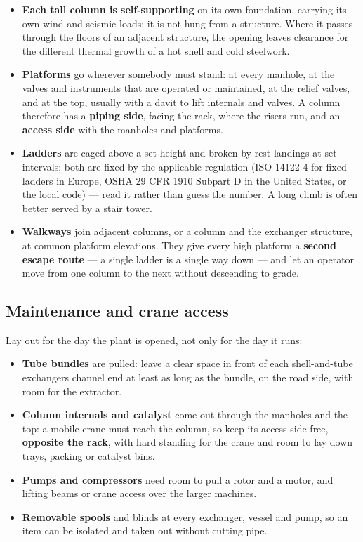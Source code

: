 \documentclass[11pt,a4paper]{article}
\providecommand{\tightlist}{\setlength{\itemsep}{0pt}\setlength{\parskip}{0pt}}
\begin{document}
\begin{itemize}
\tightlist
\item
  \textbf{Each tall column is self-supporting} on its own foundation,
  carrying its own wind and seismic loads; it is not hung from a
  structure. Where it passes through the floors of an adjacent structure,
  the opening leaves clearance for the different thermal growth of a hot
  shell and cold steelwork.
\item
  \textbf{Platforms} go wherever somebody must stand: at every manhole,
  at the valves and instruments that are operated or maintained, at the
  relief valves, and at the top, usually with a davit to lift internals
  and valves. A column therefore has a \textbf{piping side}, facing the
  rack, where the risers run, and an \textbf{access side} with the
  manholes and platforms.
\item
  \textbf{Ladders} are caged above a set height and broken by rest
  landings at set intervals; both are fixed by the applicable regulation
  (ISO 14122-4 for fixed ladders in Europe, OSHA 29 CFR 1910 Subpart D in
  the United States, or the local code) --- read it rather than guess the
  number. A long climb is often better served by a stair tower.
\item
  \textbf{Walkways} join adjacent columns, or a column and the exchanger
  structure, at common platform elevations. They give every high platform
  a \textbf{second escape route} --- a single ladder is a single way down
  --- and let an operator move from one column to the next without
  descending to grade.
\end{itemize}

\hypertarget{maintenance-and-crane-access}{%
\subsection{Maintenance and crane
access}\label{maintenance-and-crane-access}}

Lay out for the day the plant is opened, not only for the day it runs:

\begin{itemize}
\tightlist
\item
  \textbf{Tube bundles} are pulled: leave a clear space in front of each
  shell-and-tube exchanger\textquotesingle s channel end at least as long
  as the bundle, on the road side, with room for the extractor.
\item
  \textbf{Column internals and catalyst} come out through the manholes
  and the top: a mobile crane must reach the column, so keep its access
  side free, \textbf{opposite the rack}, with hard standing for the crane
  and room to lay down trays, packing or catalyst bins.
\item
  \textbf{Pumps and compressors} need room to pull a rotor and a motor,
  and lifting beams or crane access over the larger machines.
\item
  \textbf{Removable spools} and blinds at every exchanger, vessel and
  pump, so an item can be isolated and taken out without cutting pipe.
\end{itemize}
\end{document}
